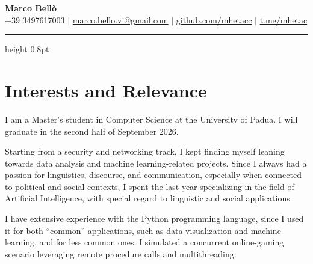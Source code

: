 \documentclass[12pt,a4paper,sans]{moderncv} %
\begin{document}
\begin{center}
    \textbf{\Huge Marco Bellò} \\ \vspace{5pt}
    \small \faMobile* +39 3497617003 \hspace{1pt} $|$
    \hspace{1pt} \faEnvelope \hspace{2pt} \href{mailto:marco.bello.vi@gmail.com}{marco.bello.vi@gmail.com} \hspace{1pt} $|$ 
    \hspace{1pt} \faGithub \hspace{2pt} \href{https://github.com/mhetacc}{github.com/mhetacc} \hspace{1pt} $|$
    \hspace{1pt} \faTelegram \hspace{2pt} \href{https://t.me/mhetac}{t.me/mhetac}
    \\ \vspace{-3pt}
\end{center}
\vspace{10pt} %

{\color{venetianred} \hrule height 0.8pt}

\vspace{10pt}
\section{Interests and Relevance}

I am a Master's student in Computer Science at the University of Padua. I will graduate in the second half of September 2026.

Starting from a security and networking track, I kept finding myself leaning towards data analysis and machine learning-related projects. Since I always had a passion for linguistics, discourse, and communication, especially when connected to political and social contexts, I spent the last year specializing in the field of Artificial Intelligence, with special regard to linguistic and social applications. 

\vspace{2mm}

I have extensive experience with the Python programming language, since I used it for both ``common'' applications, such as data visualization and machine learning, and for less common ones: I simulated a concurrent online-gaming scenario leveraging remote procedure calls and multithreading.
\end{document}
